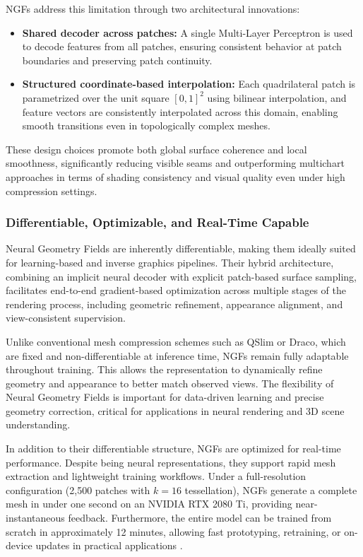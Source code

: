 NGFs address this limitation through two architectural innovations:
\begin{itemize}
    \item \textbf{Shared decoder across patches:} A single Multi-Layer Perceptron is used to decode features from all patches, ensuring consistent behavior at patch boundaries and preserving patch continuity.
    \item \textbf{Structured coordinate-based interpolation:} Each quadrilateral patch is parametrized over the unit square $[0,1]^2$ using bilinear interpolation, and feature vectors are consistently interpolated across this domain, enabling smooth transitions even in topologically complex meshes.
\end{itemize}

These design choices promote both global surface coherence and local smoothness, significantly reducing visible seams and outperforming multichart approaches in terms of shading consistency and visual quality even under high compression settings.

\subsubsection{Differentiable, Optimizable, and Real-Time Capable}

Neural Geometry Fields are inherently differentiable, making them ideally suited for learning-based and inverse graphics pipelines. 
Their hybrid architecture, combining an implicit neural decoder with explicit patch-based surface sampling, facilitates end-to-end gradient-based optimization across multiple stages of the rendering process, including geometric refinement, appearance alignment, and view-consistent supervision. 

Unlike conventional mesh compression schemes such as QSlim or Draco, which are fixed and non-differentiable at inference time, NGFs remain fully adaptable throughout training. 
This allows the representation to dynamically refine geometry and appearance to better match observed views. 
The flexibility of Neural Geometry Fields is important for data-driven learning and precise geometry correction, critical for applications in neural rendering and 3D scene understanding. 

In addition to their differentiable structure, NGFs are optimized for real-time performance. 
Despite being neural representations, they support rapid mesh extraction and lightweight training workflows. 
Under a full-resolution configuration (2,500 patches with $k=16$ tessellation), NGFs generate a complete mesh in under one second on an NVIDIA RTX 2080 Ti, providing near-instantaneous feedback. 
Furthermore, the entire model can be trained from scratch in approximately 12 minutes, allowing fast prototyping, retraining, or on-device updates in practical applications \cite{sivaram2024}. 

